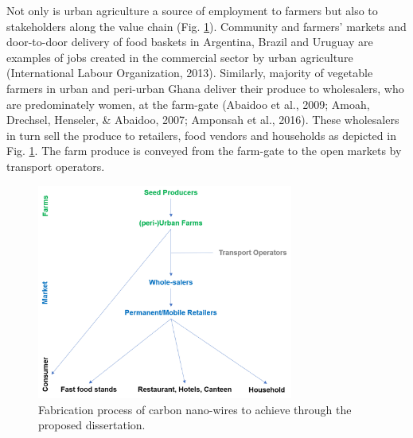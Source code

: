 Not only is urban agriculture a source of employment to farmers but also to stakeholders along the value chain (Fig. \ref{fig:vegySupplyChain}). Community and farmers' markets and door-to-door delivery of food baskets in Argentina, Brazil and Uruguay are examples of jobs created in the commercial sector by urban agriculture (International Labour Organization, 2013). Similarly, majority of vegetable farmers in urban and peri-urban Ghana deliver their produce to wholesalers, who are predominately women, at the farm-gate (Abaidoo et al., 2009; Amoah, Drechsel, Henseler, \& Abaidoo, 2007; Amponsah et al., 2016). These wholesalers in turn sell the produce to retailers, food vendors and households as depicted in Fig. \ref{fig:vegySupplyChain}. The farm produce is conveyed from the farm-gate to the open markets by transport operators.

\begin{figure}[th]
\centering
\includegraphics[width=0.75\textwidth]{./Figures/vegySupplyChain.png}
\decoRule
\caption[Carbon Nano-wires Fabrication Process]{Fabrication process of carbon nano-wires to achieve through the proposed dissertation.}
\label{fig:vegySupplyChain}
\end{figure}

